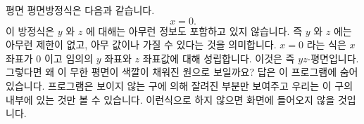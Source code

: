 \begin{surferPage}{평면}
평면방정식은 다음과 같습니다.\[x=0.\] 이 방정식은 $y$ 와 $z$ 에 대해는 아무런 정보도 포함하고 있지 않습니다. 즉 $y$ 와 $z$ 에는 아무런 제한이 없고, 아무 값이나 가질 수 있다는 것을 의미합니다.
$x=0$ 라는 식은 $x$ 좌표가 $0$ 이고 임의의 $y$ 좌표와 $z$ 좌표값에 대해 성립합니다. 이것은 즉 $yz$-평면입니다.
\newline \newline
그렇다면 왜 이 무한 평면이 색깔이 채워진 원으로 보일까요? 답은 이 프로그램에 숨어있습니다. 프로그램은 보이지 않는 구에 의해 잘려진 부분만 보여주고 우리는 이 구의 내부에 있는 것만 볼 수 있습니다. 이런식으로 하지 않으면 화면에 들어오지 않을 것입니다.
\end{surferPage}

